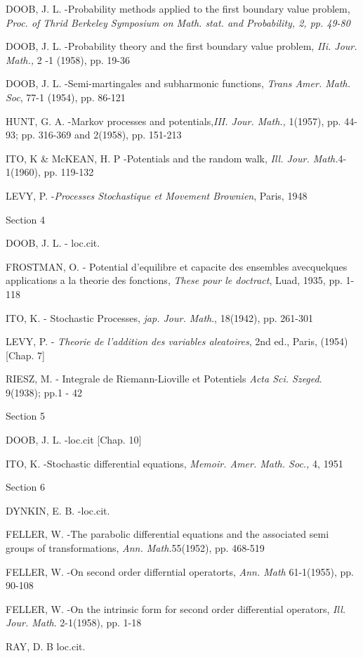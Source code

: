\begin{thebibliography}{99}
 {DOOB, J. L.} -Probability methods applied to the first
  boundary value problem, \textit{Proc. of Thrid Berkeley Symposium on
    Math. stat. and Probability, 2, pp. 49-80} 

 {DOOB, J. L.} -Probability theory and the first boundary
  value problem, \textit{IIi. Jour. Math.,} 2 -1 (1958), pp. 19-36 

 {DOOB, J. L.} -Semi-martingales and subharmonic functions,
  \textit{Trans Amer. Math. Soc}, 77-1 (1954), pp. 86-121 

 {HUNT, G. A.} -Markov processes and
  potentials,\textit{III. Jour. Math.,} 1(1957), pp. 44-93;
  pp. 316-369 and 2(1958), pp. 151-213 

 {ITO, K \& McKEAN, H. P} -Potentials and the random walk,
  \textit{Ill. Jour. Math.}4-1(1960), pp. 119-132 

 { LEVY, P.} -\textit{Processes Stochastique et Movement
  Brownien}, Paris, 1948 

Section 4

 {DOOB, J. L.} - loc.cit.

 {FROSTMAN, O.} - Potential d'equilibre et capacite des
  ensembles avecquelques applications a la theorie des fonctions,
  \textit{These pour le doctract}, Luad, 1935, pp. 1-118 

 {ITO, K.} - Stochastic Processes,
  \textit{jap. Jour. Math}., 18(1942), pp. 261-301 

 {LEVY, P.} - \textit{Theorie de l'addition des variables
  aleatoires}, 2nd ed., Paris, (1954) [Chap. 7]  

 {RIESZ, M.} - Integrale de Riemann-Lioville et Potentiels
  \textit{Acta Sci. Szeged}. 9(1938); pp.1 - 42 

Section 5

 {DOOB, J. L.} -loc.cit [Chap. 10]

 {ITO, K.} -Stochastic differential equations,
  \textit{Memoir. Amer. Math. Soc.,} 4, 1951 

Section 6\pageoriginale

 {DYNKIN, E. B.} -loc.cit.

 {FELLER, W.} -The parabolic differential equations and the
  associated semi groups of transformations,
  \textit{Ann. Math.}55(1952), pp. 468-519 

 {FELLER, W.} -On second order differntial operatorts,
  \textit{Ann. Math} 61-1(1955), pp. 90-108 

 {FELLER, W.} -On the intrinsic form for second order
  differential operators, \textit{Ill. Jour. Math}. 2-1(1958),
  pp. 1-18 

 {RAY, D. B} loc.cit.
 \end{thebibliography} 

